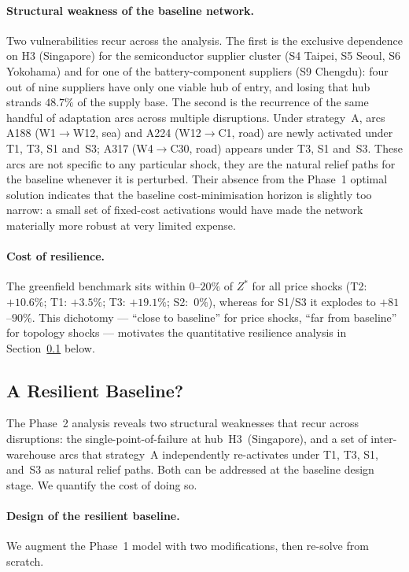 \paragraph{Structural weakness of the baseline network.}
Two vulnerabilities recur across the analysis. The first is the
exclusive dependence on H3 (Singapore) for the
semiconductor supplier cluster (S4 Taipei, S5 Seoul, S6 Yokohama)
and for one of the battery-component suppliers (S9 Chengdu): four
out of nine suppliers have only one viable hub of entry, and
losing that hub strands $48.7\%$ of the supply base.
The second is the recurrence of the same handful of adaptation
arcs across multiple disruptions. Under strategy~A, arcs
A188 (W1$\rightarrow$W12, sea) and A224 (W12$\rightarrow$C1, road)
are newly activated under T1, T3, S1 and~S3; A317
(W4$\rightarrow$C30, road) appears under T3, S1 and~S3.
These arcs are not specific to any particular shock, they
are the natural relief paths for the baseline whenever it is
perturbed. Their absence from the Phase~1 optimal solution
indicates that the baseline cost-minimisation horizon is slightly
too narrow: a small set of fixed-cost activations would have made
the network materially more robust at very limited expense.

\paragraph{Cost of resilience.}
The greenfield benchmark sits within $0$--$20\%$ of $Z^*$ for all
price shocks (T2: $+10.6\%$; T1: $+3.5\%$; T3: $+19.1\%$; S2:~$0\%$),
whereas for S1/S3 it explodes to $+81$--$90\%$. This dichotomy ---
``close to baseline'' for price shocks, ``far from baseline'' for
topology shocks --- motivates the quantitative resilience analysis
in Section~\ref{sec:resilient_baseline} below.

\subsection{A Resilient Baseline?}
\label{sec:resilient_baseline}
 
The Phase~2 analysis reveals two structural weaknesses that
recur across disruptions: the single-point-of-failure at
hub~H3~(Singapore), and a set of inter-warehouse arcs that
strategy~A independently re-activates under T1, T3, S1, and~S3
as natural relief paths. Both can be addressed at the baseline
design stage. We quantify the cost of doing so.
 
\paragraph{Design of the resilient baseline.}
We augment the Phase~1 model with two modifications, then
re-solve from scratch.
 
